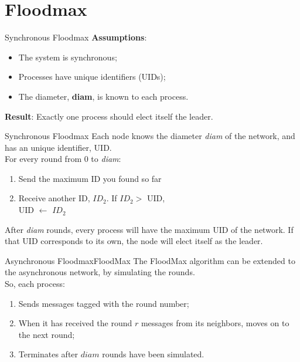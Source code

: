 \documentclass[pdf]{beamer}
\begin{document}
\section{Floodmax}

\begin{frame}{Synchronous Floodmax}
    \textbf{Assumptions}:
    \begin{itemize}
        \item The system is synchronous;
        \item Processes have unique identifiers (UIDs);
        \item The diameter, \textbf{diam}, is known to each process.
    \end{itemize}
    
    \vspace{12pt}
    \textbf{Result}:
    Exactly one process should elect itself the leader.
\end{frame}

\begin{frame}{Synchronous Floodmax}
    \vspace{12pt}
    Each node knows the diameter \emph{diam} of the network, and has an unique identifier, UID. \\
    For every round from 0 to \emph{diam}:
    \begin{enumerate}
        \item Send the maximum ID you found so far
        \item Receive another ID, $ID_{2}$. If $ID_{2} >$ UID, \\
         UID $\leftarrow$ $ID_{2}$ 
    \end{enumerate}
    After \emph{diam} rounds, every process will have the maximum UID of the network.
    If that UID corresponds to its own, the node will elect itself as the leader.
\end{frame}

\begin{frame}{Asynchronous Floodmax}{FloodMax}
    The FloodMax algorithm can be extended to the asynchronous network, by simulating
    the rounds.\\
    So, each process:
    \vspace{12pt}
    \begin{enumerate}
        \item Sends messages tagged with the round number; \\
        \item When it has received the round $r$ messages from its neighbors, moves on to the next round; \\
        \item Terminates after $diam$ rounds have been simulated. \\
    \end{enumerate}
\end{frame}
\end{document}
